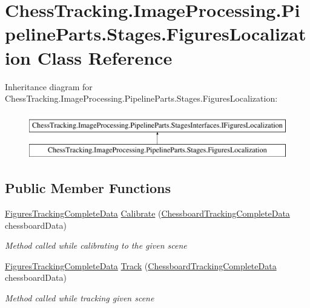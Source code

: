 \hypertarget{class_chess_tracking_1_1_image_processing_1_1_pipeline_parts_1_1_stages_1_1_figures_localization}{}\section{Chess\+Tracking.\+Image\+Processing.\+Pipeline\+Parts.\+Stages.\+Figures\+Localization Class Reference}
\label{class_chess_tracking_1_1_image_processing_1_1_pipeline_parts_1_1_stages_1_1_figures_localization}
Inheritance diagram for Chess\+Tracking.\+Image\+Processing.\+Pipeline\+Parts.\+Stages.\+Figures\+Localization\+:\begin{figure}[H]
\begin{center}
\leavevmode
\includegraphics[height=2.000000cm]{class_chess_tracking_1_1_image_processing_1_1_pipeline_parts_1_1_stages_1_1_figures_localization}
\end{center}
\end{figure}
\subsection*{Public Member Functions}
\begin{DoxyCompactItemize}
\item 
\mbox{\hyperlink{class_chess_tracking_1_1_image_processing_1_1_pipeline_data_1_1_figures_tracking_complete_data}{Figures\+Tracking\+Complete\+Data}} \mbox{\hyperlink{class_chess_tracking_1_1_image_processing_1_1_pipeline_parts_1_1_stages_1_1_figures_localization_aa4fc69a70edd3ecc04d778972071d491}{Calibrate}} (\mbox{\hyperlink{class_chess_tracking_1_1_image_processing_1_1_pipeline_data_1_1_chessboard_tracking_complete_data}{Chessboard\+Tracking\+Complete\+Data}} chessboard\+Data)
\begin{DoxyCompactList}\small\item\em Method called while calibrating to the given scene \end{DoxyCompactList}\item 
\mbox{\hyperlink{class_chess_tracking_1_1_image_processing_1_1_pipeline_data_1_1_figures_tracking_complete_data}{Figures\+Tracking\+Complete\+Data}} \mbox{\hyperlink{class_chess_tracking_1_1_image_processing_1_1_pipeline_parts_1_1_stages_1_1_figures_localization_a1ec6c1018b9ea05d0ec29f66692f8def}{Track}} (\mbox{\hyperlink{class_chess_tracking_1_1_image_processing_1_1_pipeline_data_1_1_chessboard_tracking_complete_data}{Chessboard\+Tracking\+Complete\+Data}} chessboard\+Data)
\begin{DoxyCompactList}\small\item\em Method called while tracking given scene \end{DoxyCompactList}\end{DoxyCompactItemize}
